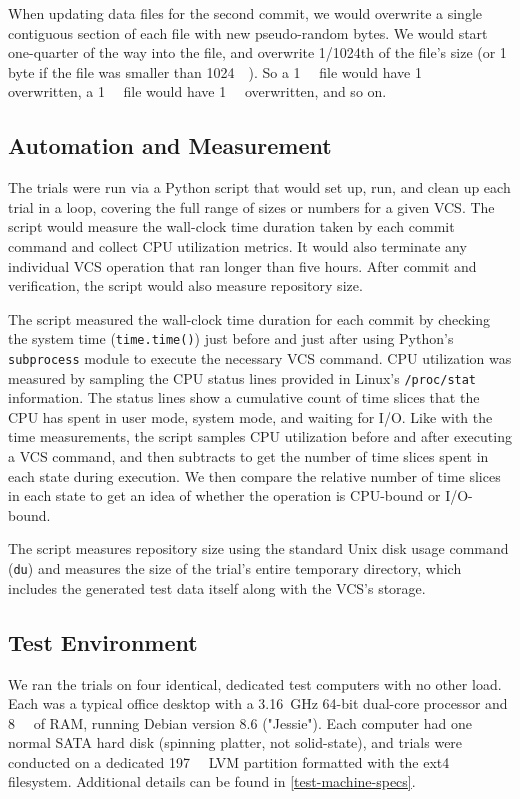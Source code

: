 When updating data files for the second commit, we would overwrite a single
contiguous section of each file with new pseudo-random bytes. We would start
one-quarter of the way into the file, and overwrite \num{1/1024}th of the file's
size (or 1 byte if the file was smaller than \SI{1024}{\kibi\byte}). So a
\SI{1}{\mebi\byte} file would have \SI{1}{\kibi\byte} overwritten, a
\SI{1}{\gibi\byte} file would have \SI{1}{\mebi\byte} overwritten, and so on.


\subsection{Automation and Measurement}

The trials were run via a Python script that would set up, run, and clean up
each trial in a loop, covering the full range of sizes or numbers for a given
VCS. The script would measure the wall-clock time duration taken by each commit
command and collect CPU utilization metrics. It would also terminate any
individual VCS operation that ran longer than five hours. After commit and
verification, the script would also measure repository size.

The script measured the wall-clock time duration for each commit by checking the
system time (\lstinline{time.time()}) just before and just after using Python's
\lstinline{subprocess} module to execute the necessary VCS command. CPU
utilization was measured by sampling the CPU status lines provided in Linux's
\lstinline{/proc/stat} information. The status lines show a cumulative count of
time slices that the CPU has spent in user mode, system mode, and waiting for
I/O. Like with the time measurements, the script samples CPU utilization before
and after executing a VCS command, and then subtracts to get the number of time
slices spent in each state during execution. We then compare the relative number
of time slices in each state to get an idea of whether the operation is
CPU-bound or I/O-bound.

The script measures repository size using the standard Unix disk usage command
(\lstinline{du}) and measures the size of the trial's entire temporary
directory, which includes the generated test data itself along with the VCS's
storage.


\subsection{Test Environment}

We ran the trials on four identical, dedicated test computers with no other
load. Each was a typical office desktop with a \SI{3.16}{\giga\hertz}
\num{64}-bit dual-core processor and \SI{8}{\gibi\byte} of RAM, running Debian
version 8.6 ("Jessie"). Each computer had one normal SATA hard disk (spinning
platter, not solid-state), and trials were conducted on a dedicated
\SI{197}{\gibi\byte} LVM partition formatted with the ext4 filesystem.
Additional details can be found in \autoref{test-machine-specs}.

